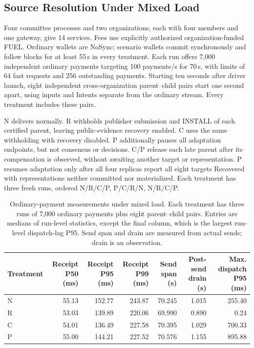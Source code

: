\subsection{Source Resolution Under Mixed Load}
\label{sec:eval-mixed}
\label{sec:eval-liabilities}
\label{sec:eval-repair}

Four committee processes and two organizations, each with four members
and one gateway, give 14 services. Fees use explicitly authorized
organization-funded FUEL. Ordinary wallets are NoSync; scenario wallets
commit synchronously and follow blocks for at least 55\,s in every
treatment. Each run offers 7,000 independent ordinary payments targeting
100 payments/s for 70\,s, with limits of 64 fast requests and 256
outstanding payments. Starting ten seconds after driver launch, eight
independent cross-organization parent--child pairs start one second
apart, using inputs and Intents separate from the ordinary stream.
Every treatment includes these pairs.

N delivers normally. R withholds publisher submission and INSTALL of
each certified parent, leaving public-evidence recovery enabled.
C uses the same withholding with recovery disabled. P additionally
pauses all adaptation endpoints, but not consensus or decisions.
C/P release each late parent after its compensation is observed,
without awaiting another target or representation. P resumes adaptation
only after all four replicas report all eight targets Recovered with
representations neither committed nor materialized. Each treatment has
three fresh runs, ordered N/R/C/P, P/C/R/N, N/R/C/P.

\begin{table}[t]
  \caption{Ordinary-payment measurements under mixed load. Each treatment
    has three runs of 7,000 ordinary payments plus eight parent--child
    pairs. Entries are medians of run-level statistics, except the final
    column, which is the largest run-level dispatch-lag P95. Send span
    and drain are measured from actual sends; drain is an observation.}
  \label{tab:eval-mixed}
  \centering
  \small
  \setlength{\tabcolsep}{7pt}
  \begin{tabular}{@{}lrrrrrr@{}}
    \toprule
    Treatment &
    \shortstack{Receipt P50\\(ms)} &
    \shortstack{Receipt P95\\(ms)} &
    \shortstack{Receipt P99\\(ms)} &
    \shortstack{Send span\\(s)} &
    \shortstack{Post-send drain\\(s)} &
    \shortstack{Max. dispatch P95\\(ms)} \\
    \midrule
    N & 55.13 & 152.77 & 243.87 & 70.245 & 1.015 & 255.40 \\
    R & 53.03 & 139.89 & 220.06 & 69.990 & 0.890 & 0.24 \\
    C & 54.01 & 136.49 & 227.58 & 70.395 & 1.029 & 700.33 \\
    P & 55.00 & 144.21 & 227.52 & 70.576 & 1.155 & 895.88 \\
    \bottomrule
  \end{tabular}
\end{table}

